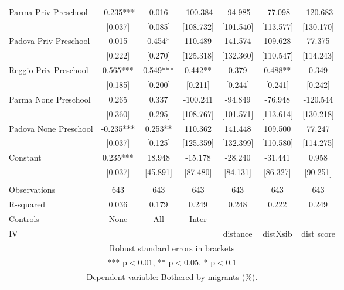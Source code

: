 \begin{tabular}{lcccccc}
Parma Priv Preschool & -0.235*** & 0.016 & -100.384 & -94.985 & -77.098 & -120.683 \\
 & [0.037] & [0.085] & [108.732] & [101.540] & [113.577] & [130.170] \\
Padova Priv Preschool & 0.015 & 0.454* & 110.489 & 141.574 & 109.628 & 77.375 \\
 & [0.222] & [0.270] & [125.318] & [132.360] & [110.547] & [114.243] \\
Reggio Priv Preschool & 0.565*** & 0.549*** & 0.442** & 0.379 & 0.488** & 0.349 \\
 & [0.185] & [0.200] & [0.211] & [0.244] & [0.241] & [0.242] \\
Parma None Preschool & 0.265 & 0.337 & -100.241 & -94.849 & -76.948 & -120.544 \\
 & [0.360] & [0.295] & [108.767] & [101.571] & [113.614] & [130.218] \\
Padova None Preschool & -0.235*** & 0.253** & 110.362 & 141.448 & 109.500 & 77.247 \\
 & [0.037] & [0.125] & [125.359] & [132.399] & [110.580] & [114.275] \\
Constant & 0.235*** & 18.948 & -15.178 & -28.240 & -31.441 & 0.958 \\
 & [0.037] & [45.891] & [87.480] & [84.131] & [86.327] & [90.251] \\
 &  &  &  &  &  &  \\
Observations & 643 & 643 & 643 & 643 & 643 & 643 \\
R-squared & 0.036 & 0.179 & 0.249 & 0.248 & 0.222 & 0.249 \\
Controls & None & All & Inter &  &  &  \\
 IV &  &  &  & distance & distXsib & dist score \\ \hline
\multicolumn{7}{c}{ Robust standard errors in brackets} \\
\multicolumn{7}{c}{ *** p$<$0.01, ** p$<$0.05, * p$<$0.1} \\
\multicolumn{7}{c}{ Dependent variable: Bothered by migrants (\%).} \\
\end{tabular}
